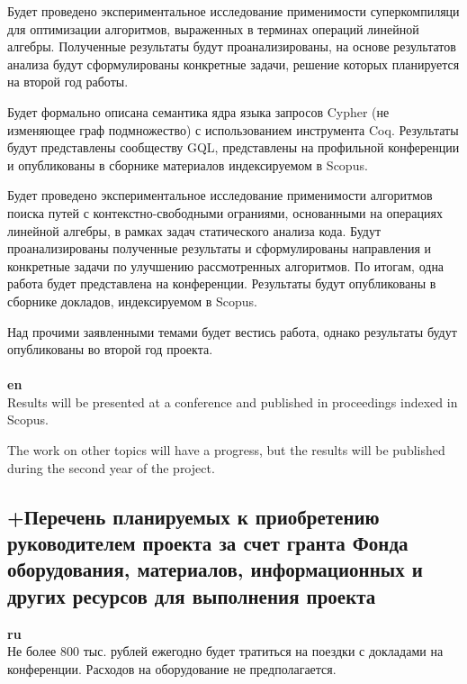 \documentclass[12pt]{article}  %
\theoremstyle{remark}
\begin{document}
Будет проведено экспериментальное исследование применимости суперкомпиляци для оптимизации алгоритмов, выраженных в терминах операций линейной алгебры. Полученные результаты будут проанализированы, на основе результатов анализа будут сформулированы конкретные задачи, решение которых планируется на второй год работы.

Будет формально описана семантика ядра языка запросов Cypher (не изменяющее граф подмножество) с использованием инструмента Coq. Результаты будут представлены сообществу GQL, представлены на профильной конференции и опубликованы в сборнике материалов индексируемом в Scopus. 

Будет проведено экспериментальное исследование применимости алгоритмов поиска путей с контекстно-свободными ограниями, основанными на операциях линейной алгебры, в рамках задач статического анализа кода. Будут проанализированы полученные результаты и сформулированы направления и конкретные задачи по улучшению рассмотренных алгоритмов. По итогам, одна работа будет представлена на конференции. Результаты будут опубликованы в сборнике докладов, индексируемом в Scopus.

Над прочими заявленными темами будет вестись работа, однако результаты будут опубликованы во второй год проекта.
\\
\\
\textbf{en}\\
Results will be presented at a conference and published in proceedings indexed in Scopus.

The work on other topics will have a progress, but the results will be published during the second year of the project.

\subsection{+Перечень планируемых к приобретению руководителем проекта за счет гранта Фонда оборудования, материалов, информационных и других ресурсов для выполнения проекта}

\textbf{ru}\\
%
Не более 800 тыс. рублей ежегодно будет тратиться на поездки с докладами на конференции. Расходов на оборудование не предполагается.
\end{document}

